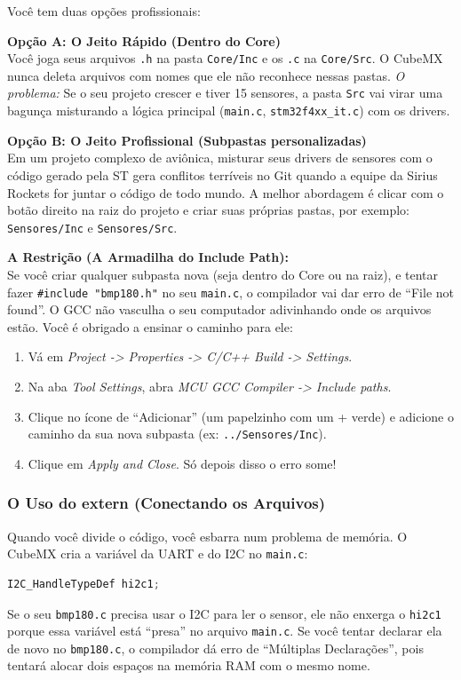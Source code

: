 \documentclass[12pt,a4paper]{article}
\begin{document}
Você tem duas opções profissionais:

\textbf{Opção A: O Jeito Rápido (Dentro do Core)}\\
Você joga seus arquivos \texttt{.h} na pasta \texttt{Core/Inc} e os \texttt{.c} na \texttt{Core/Src}. O CubeMX nunca deleta arquivos com nomes que ele não reconhece nessas pastas.
\textit{O problema:} Se o seu projeto crescer e tiver 15 sensores, a pasta \texttt{Src} vai virar uma bagunça misturando a lógica principal (\texttt{main.c}, \texttt{stm32f4xx\_it.c}) com os drivers.

\textbf{Opção B: O Jeito Profissional (Subpastas personalizadas)}\\
Em um projeto complexo de aviônica, misturar seus drivers de sensores com o código gerado pela ST gera conflitos terríveis no Git quando a equipe da Sirius Rockets for juntar o código de todo mundo.
A melhor abordagem é clicar com o botão direito na raiz do projeto e criar suas próprias pastas, por exemplo: \texttt{Sensores/Inc} e \texttt{Sensores/Src}.

\textbf{A Restrição (A Armadilha do Include Path):}\\
Se você criar qualquer subpasta nova (seja dentro do Core ou na raiz), e tentar fazer \texttt{\#include "bmp180.h"} no seu \texttt{main.c}, o compilador vai dar erro de ``File not found''. O GCC não vasculha o seu computador adivinhando onde os arquivos estão. Você é obrigado a ensinar o caminho para ele:
\begin{enumerate}
    \item Vá em \textit{Project -> Properties -> C/C++ Build -> Settings}.
    \item Na aba \textit{Tool Settings}, abra \textit{MCU GCC Compiler -> Include paths}.
    \item Clique no ícone de ``Adicionar'' (um papelzinho com um + verde) e adicione o caminho da sua nova subpasta (ex: \texttt{../Sensores/Inc}).
    \item Clique em \textit{Apply and Close}. Só depois disso o erro some!
\end{enumerate}

\subsubsection{O Uso do extern (Conectando os Arquivos)}
Quando você divide o código, você esbarra num problema de memória. O CubeMX cria a variável da UART e do I2C no \texttt{main.c}:
\begin{lstlisting}[language=C]
I2C_HandleTypeDef hi2c1;
\end{lstlisting}
Se o seu \texttt{bmp180.c} precisa usar o I2C para ler o sensor, ele não enxerga o \texttt{hi2c1} porque essa variável está ``presa'' no arquivo \texttt{main.c}. Se você tentar declarar ela de novo no \texttt{bmp180.c}, o compilador dá erro de ``Múltiplas Declarações'', pois tentará alocar dois espaços na memória RAM com o mesmo nome.
\end{document}
